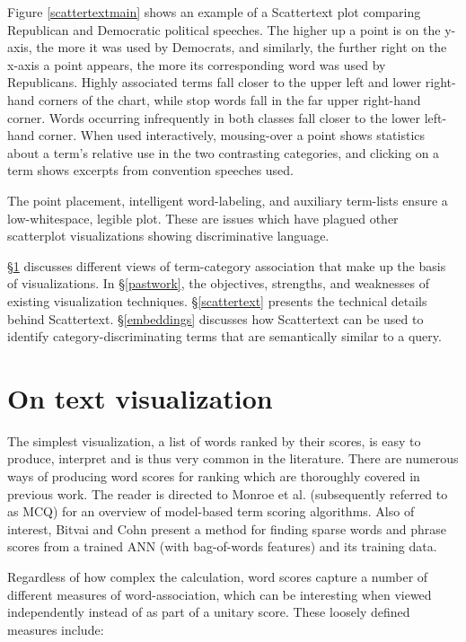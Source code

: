 \documentclass[11pt,a4paper]{article}
\begin{document}
Figure \ref{scattertextmain} shows an example of a Scattertext plot comparing Republican and Democratic political speeches.  The higher up a point is on the y-axis, the more it was used by Democrats, and similarly, the further right on the x-axis a point appears, the more its corresponding word was used by Republicans.  Highly associated terms fall closer to the upper left and lower right-hand corners of the chart, while stop words fall in the far upper right-hand corner.  Words occurring infrequently in both classes fall closer to the lower left-hand corner.  
When used interactively, mousing-over a point shows statistics about a term's relative use in the two contrasting categories, and clicking on a term shows excerpts from convention speeches used.  

The point placement, intelligent word-labeling, and auxiliary term-lists ensure a low-whitespace, legible plot.  These are issues which have plagued other scatterplot visualizations showing discriminative language.

\S\ref{onviz} discusses different views of term-category association that make up the basis of visualizations.  In \S\ref{pastwork}, the objectives, strengths, and weaknesses of existing visualization techniques. \S\ref{scattertext} presents the technical details behind Scattertext. \S\ref{embeddings} discusses how Scattertext can be used to identify category-discriminating terms that are semantically similar to a query.
\section{On text visualization}
\label{onviz}
The simplest visualization, a list of words ranked by their scores, is easy to produce, interpret and is thus very common in the literature.  There are numerous ways of producing word scores for ranking which are thoroughly covered in previous work.  The reader is directed to Monroe et al.  (subsequently referred to as MCQ) for an overview of model-based term scoring algorithms.  Also of interest, Bitvai and Cohn  present a method for finding sparse words and phrase scores from a trained ANN (with bag-of-words features) and its training data. 

Regardless of how complex the calculation, word scores capture a number of different measures of word-association, which can be interesting when viewed independently instead of as part of a unitary score.  These loosely defined measures include:  \vspace{-0.1in}
\end{document}
